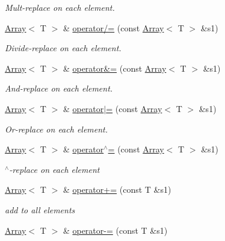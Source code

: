 \begin{DoxyCompactItemize}
\begin{DoxyCompactList}\small\item\em Mult-\/replace on each element. \end{DoxyCompactList}\item 
\mbox{\hyperlink{classXMLArray_1_1Array}{Array}}$<$ T $>$ \& \mbox{\hyperlink{classXMLArray_1_1Array_ad729e7678e412fb09104173dbe12a1fc}{operator/=}} (const \mbox{\hyperlink{classXMLArray_1_1Array}{Array}}$<$ T $>$ \&s1)
\begin{DoxyCompactList}\small\item\em Divide-\/replace on each element. \end{DoxyCompactList}\item 
\mbox{\hyperlink{classXMLArray_1_1Array}{Array}}$<$ T $>$ \& \mbox{\hyperlink{classXMLArray_1_1Array_a7a015abc3dfa498a8feb234b51d4c341}{operator\&=}} (const \mbox{\hyperlink{classXMLArray_1_1Array}{Array}}$<$ T $>$ \&s1)
\begin{DoxyCompactList}\small\item\em And-\/replace on each element. \end{DoxyCompactList}\item 
\mbox{\hyperlink{classXMLArray_1_1Array}{Array}}$<$ T $>$ \& \mbox{\hyperlink{classXMLArray_1_1Array_a4a61c5f3146f39c99758bad927e08de7}{operator$\vert$=}} (const \mbox{\hyperlink{classXMLArray_1_1Array}{Array}}$<$ T $>$ \&s1)
\begin{DoxyCompactList}\small\item\em Or-\/replace on each element. \end{DoxyCompactList}\item 
\mbox{\hyperlink{classXMLArray_1_1Array}{Array}}$<$ T $>$ \& \mbox{\hyperlink{classXMLArray_1_1Array_a8e2621caf3277b85e6898a3eceb9b233}{operator$^\wedge$=}} (const \mbox{\hyperlink{classXMLArray_1_1Array}{Array}}$<$ T $>$ \&s1)
\begin{DoxyCompactList}\small\item\em $^\wedge$-\/replace on each element \end{DoxyCompactList}\item 
\mbox{\hyperlink{classXMLArray_1_1Array}{Array}}$<$ T $>$ \& \mbox{\hyperlink{classXMLArray_1_1Array_ad3487cb84f2a45cc24ed06f5e96a62ee}{operator+=}} (const T \&s1)
\begin{DoxyCompactList}\small\item\em add to all elements \end{DoxyCompactList}\item 
\mbox{\hyperlink{classXMLArray_1_1Array}{Array}}$<$ T $>$ \& \mbox{\hyperlink{classXMLArray_1_1Array_af903951b5031ab6aa7ee8e2682055f91}{operator-\/=}} (const T \&s1)

\end{DoxyCompactItemize}
